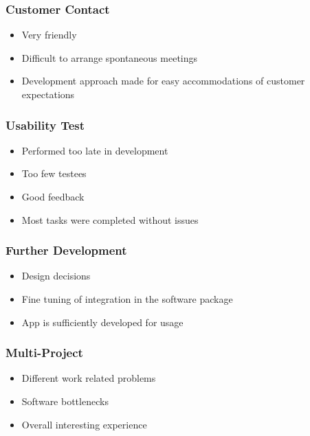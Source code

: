 		\begin{frame}
			\frametitle{Customer Contact}
			\begin{itemize}
				\item Very friendly
				\item Difficult to arrange spontaneous meetings
				\item Development approach made for easy accommodations of customer expectations
			\end{itemize}
		\end{frame}
		
		\begin{frame}
			\frametitle{Usability Test}
			\begin{itemize}
				\item Performed too late in development
				\item Too few testees
				\item Good feedback
				\item Most tasks were completed without issues
			\end{itemize}
		\end{frame}
		
		\begin{frame}
			\frametitle{Further Development}
			\begin{itemize}
				\item Design decisions
				\item Fine tuning of integration in the software package
				\item App is sufficiently developed for usage
			\end{itemize}
		\end{frame}
		
				
		\begin{frame}
			\frametitle{Multi-Project}
			\begin{itemize}
				\item Different work related problems
				\item Software bottlenecks
			     \item Overall interesting experience
			\end{itemize}
		\end{frame}